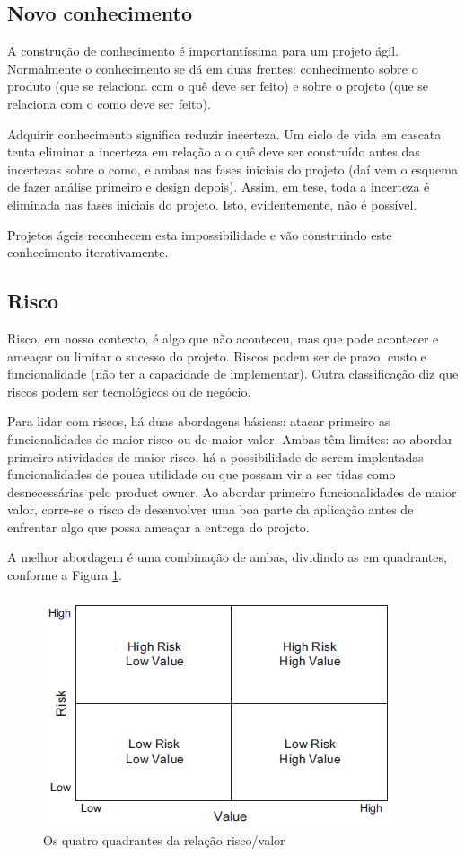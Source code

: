 \documentclass[a4paper,abntfigtabnum,noindentfirst]{abnt}
\begin{document}
\subsection{Novo conhecimento}

A construção de conhecimento é importantíssima para um projeto ágil. Normalmente o conhecimento se dá em duas frentes: conhecimento sobre o produto (que se relaciona com o quê deve ser feito) e sobre o projeto (que se relaciona com o como deve ser feito).

Adquirir conhecimento significa reduzir incerteza. Um ciclo de vida em cascata tenta eliminar a incerteza em relação a o quê deve ser construído antes das incertezas sobre o como, e ambas nas fases iniciais do projeto (daí vem o esquema de fazer análise primeiro e design depois). Assim, em tese, toda a incerteza é eliminada nas fases iniciais do projeto. Isto, evidentemente, não é possível.

Projetos ágeis reconhecem esta impossibilidade e vão construindo este conhecimento iterativamente.

\subsection{Risco}

Risco, em nosso contexto, é algo que não aconteceu, mas que pode acontecer e ameaçar ou limitar o sucesso do projeto. Riscos podem ser de prazo, custo e funcionalidade (não ter a capacidade de implementar). Outra classificação diz que riscos podem ser tecnológicos ou de negócio.

Para lidar com riscos, há duas abordagens básicas: atacar primeiro as funcionalidades de maior risco ou de maior valor. Ambas têm limites: ao abordar primeiro atividades de maior risco, há a possibilidade de serem implentadas funcionalidades de pouca utilidade ou que possam vir a ser tidas como desnecessárias pelo product owner. Ao abordar primeiro funcionalidades de maior valor, corre-se o risco de desenvolver uma boa parte da aplicação antes de enfrentar algo que possa ameaçar a entrega do projeto.

A melhor abordagem é uma combinação de ambas, dividindo as em quadrantes, conforme a Figura \ref{relacao-risco-valor}.

\begin{figure}
	\caption{Os quatro quadrantes da relação risco/valor}
	\label{relacao-risco-valor}
	\includegraphics[scale=0.8]{relacao-risco-valor}
\end{figure}
\end{document}
